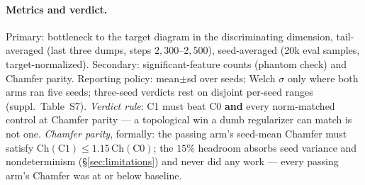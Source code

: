 \paragraph{Metrics and verdict.} Primary: bottleneck to the target
diagram in the discriminating dimension, tail-averaged (last three
dumps, steps $2{,}300$--$2{,}500$), seed-averaged (20k eval samples,
target-normalized).
Secondary: significant-feature counts (phantom check) and Chamfer parity.
Reporting policy: mean$\pm$sd over seeds; Welch $\sigma$ only where both
arms ran five seeds; three-seed verdicts rest on disjoint per-seed
ranges (suppl.\ Table~S7).
\emph{Verdict rule}: C1 must beat C0 \textbf{and} every norm-matched
control at Chamfer parity --- a topological win a dumb regularizer can
match is not one. \emph{Chamfer parity}, formally: the passing arm's
seed-mean Chamfer must satisfy
$\mathrm{Ch}(\mathrm{C1})\le 1.15\,\mathrm{Ch}(\mathrm{C0})$; the $15\%$
headroom absorbs seed variance and nondeterminism
(\S\ref{sec:limitations}) and never did any work --- every
passing arm's Chamfer was at or below baseline.
